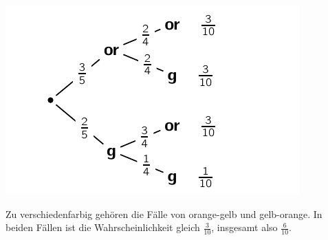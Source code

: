 \documentclass[a4paper,11pt]{../exam2e}
\begin{document}
\begin{questions}
\begin{solution}
\begin{subparts}
	\includegraphics{baumdiagramm}

	\subpart Zu verschiedenfarbig gehören die Fälle von orange-gelb und gelb-orange. In beiden Fällen ist die Wahrscheinlichkeit gleich $\frac{3}{10}$, insgesamt also $\frac{6}{10}$.
\end{subparts}

\end{solution}


\end{questions}%


\clearpage
\addtocounter{page}{-1}
\thispagestyle{empty} 



\end{document}
